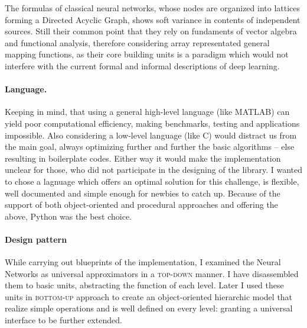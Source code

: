 The formulas of classical neural networks, whose nodes are organized into lattices forming a Directed Acyclic Graph, shows soft variance in contents of independent sources. Still their common point that they rely on fundaments of vector algebra and functional analysis, therefore considering array representated general mapping functions, as their core building units is a paradigm which would not interfere with the current formal and informal descriptions of deep learning.

\paragraph{Language.} Keeping in mind, that using a general high-level language (like MATLAB) can yield poor computational efficiency, making benchmarks, testing and applications impossible.
Also considering a low-level language (like C) would distract us from the main goal, always optimizing further and further the basic algorithms -- else resulting in boilerplate codes. Either way it would make the implementation unclear for those, who did not participate in the designing of the library.
I wanted to chose a lagnuage which offers an optimal solution for this challenge, is flexible, well documented and simple enough for newbies to catch up.
Because of the support of both object-oriented and procedural approaches and offering the above, Python was the best choice.

\paragraph{Design pattern} While carrying out blueprints of the implementation, I examined the Neural Networks as universal approximators in a \textsc{top-down} manner.
I have disassembled them to basic units, abstracting the function of each level.
Later I used these units in \textsc{bottom-up} approach to create an object-oriented hierarchic model that realize simple operations and is well defined on every level: granting a universal interface to be further extended.

